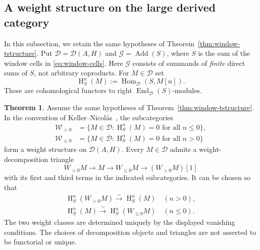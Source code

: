\documentclass[11pt]{article}
\theoremstyle{definition}
\newtheorem{thm}{Theorem}[section]
\numberwithin{equation}{section}
\newcommand{\Hom}{\operatorname{Hom}}
\newcommand{\End}{\operatorname{End}}
\newcommand{\add}{\operatorname{Add}}
\newcommand{\mH}{\operatorname{H}}
\newcommand{\Der}{\mathcal{D}}
\begin{document}
\subsection{A weight structure on the large derived category}
\label{sec:large-weight}
In this subsection, we retain the same hypotheses of
Theorem~\ref{thm:window-tstructure}.  Put $\mathcal D=\Der(A,H)$ and
$\mathcal G=\add(S)$, where $S$ is the sum of the window cells in
\eqref{eq:window-cells}.  Here $\mathcal G$ consists of summands of
\emph{finite} direct sums of $S$, not arbitrary coproducts.
For $M\in\mathcal D$ set
\[
 \mH_S^n(M):=\Hom_{\mathcal D}(S,M[n]).
\]
These are cohomological functors to right $\End_{\mathcal D}(S)$-modules.

\begin{thm}
\label{thm:connected-large-weight}
Assume the same hypotheses of Theorem~\ref{thm:window-tstructure}.  In the convention of
Keller--Nicol\'as~\cite[Theorem~4.1]{KeNi}, the subcategories
\begin{align}
 \mathcal W_{>0}
   &=\{M\in\mathcal D:\mH_S^n(M)=0\text{ for all }n\le0\},
 \label{eq:large-weight-positive}\\
 \mathcal W_{\le0}
   &=\{M\in\mathcal D:\mH_S^n(M)=0\text{ for all }n>0\}
 \label{eq:large-weight-nonpositive}
\end{align}
form a weight structure on $\Der(A,H)$.  Every $M\in\mathcal D$
admits a weight-decomposition triangle
\begin{equation}\label{eq:large-weight-triangle}
 W_{>0}M\longrightarrow M\longrightarrow W_{\le0}M
             \longrightarrow (W_{>0}M)[1]
\end{equation}
with its first and third terms in the indicated subcategories.  It
can be chosen so that
\begin{equation}\label{eq:large-weight-Hom-isomorphisms}
 \begin{aligned}
 \mH_S^n(W_{>0}M)\xrightarrow{\sim} \mH_S^n(M) \quad (n>0),\\
 \mH_S^n(M)\xrightarrow{\sim} \mH_S^n(W_{\le0}M) \quad (n\le0).
 \end{aligned}
\end{equation}
The two weight classes are determined uniquely by the displayed
vanishing conditions.  The choices of decomposition objects and
triangles are not asserted to be functorial or unique.
\end{thm}
\end{document}
